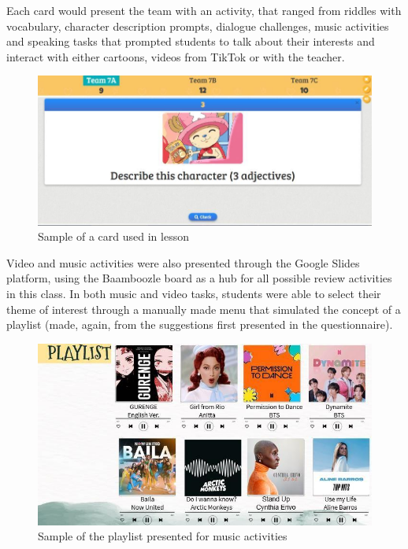 \documentclass[english]{textolivre}
\begin{document}
Each card would present the team with an activity, that ranged from riddles with vocabulary, character description prompts, dialogue challenges, music activities and speaking tasks that prompted students to talk about their interests and interact with either cartoons, videos from TikTok or with the teacher.

\begin{figure}[h!]
\centering
\begin{minipage}{.8\textwidth}
 \includegraphics[width=\textwidth]{Fig4.jpg}
 \caption{Sample of a card used in lesson}
 \label{fig04}
\end{minipage}
\end{figure}

Video and music activities were also presented through the Google Slides platform, using the Baamboozle board as a hub for all possible review activities in this class. In both music and video tasks, students were able to select their theme of interest through a manually made menu that simulated the concept of a playlist (made, again, from the suggestions first presented in the questionnaire).

\begin{figure}[h!]
\centering
\begin{minipage}{.8\textwidth}
 \includegraphics[width=\textwidth]{Fig5.jpg}
 \caption{Sample of the playlist presented for music activities}
 \label{fig05}
\end{minipage}
\end{figure}
\end{document}
